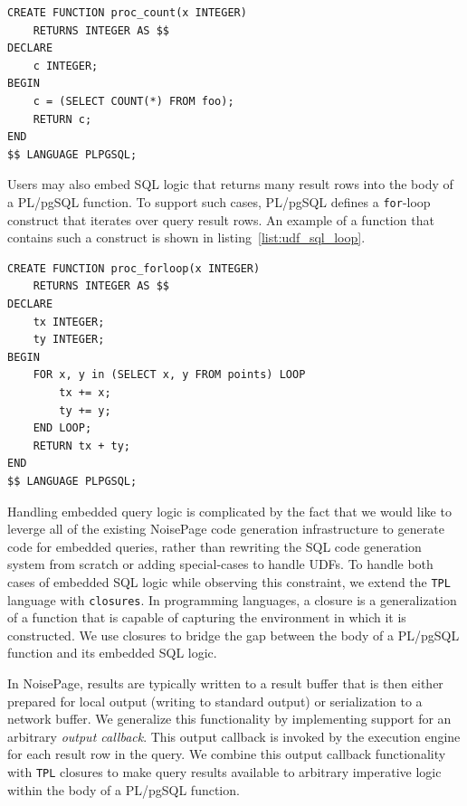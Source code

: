 \documentclass{vldb}
\newcommand{\tpl}{\texttt{TPL}\xspace}
\newcommand{\plpgsql}{PL/pgSQL\xspace}
\begin{document}
\begin{listing}
    \begin{verbatim}
CREATE FUNCTION proc_count(x INTEGER) 
    RETURNS INTEGER AS $$
DECLARE 
    c INTEGER;
BEGIN
    c = (SELECT COUNT(*) FROM foo);
    RETURN c;
END
$$ LANGUAGE PLPGSQL;
    \end{verbatim}
    \caption{A UDF with embedded SQL aggregation.}
    \label{list:udf_sql_simple}
\end{listing}

Users may also embed SQL logic that returns many result rows into the body of a \plpgsql function. To support such cases, \plpgsql defines a \texttt{for}-loop construct that iterates over query result rows. An example of a function that contains such a construct is shown in listing~\ref{list:udf_sql_loop}.

\begin{listing}
    \begin{verbatim}
CREATE FUNCTION proc_forloop(x INTEGER) 
    RETURNS INTEGER AS $$
DECLARE 
    tx INTEGER;
    ty INTEGER;
BEGIN
    FOR x, y in (SELECT x, y FROM points) LOOP
        tx += x;
        ty += y;
    END LOOP;
    RETURN tx + ty;
END
$$ LANGUAGE PLPGSQL;
    \end{verbatim}
    \caption{A UDF with For-S Style \texttt{for}-loop that iterates over query result.}
    \label{list:udf_sql_loop}
\end{listing}

Handling embedded query logic is complicated by the fact that we would like to leverge all of the existing NoisePage code generation infrastructure to generate code for embedded queries, rather than rewriting the SQL code generation system from scratch or adding special-cases to handle UDFs. To handle both cases of embedded SQL logic while observing this constraint, we extend the \tpl language with \texttt{closures}. In programming languages, a closure is a generalization of a function that is capable of capturing the environment in which it is constructed. We use closures to bridge the gap between the body of a \plpgsql function and its embedded SQL logic.

In NoisePage, results are typically written to a result buffer that is then either prepared for local output (writing to standard output) or serialization to a network buffer. We generalize this functionality by implementing support for an arbitrary \textit{output callback}. This output callback is invoked by the execution engine for each result row in the query. We combine this output callback functionality with \tpl closures to make query results available to arbitrary imperative logic within the body of a \plpgsql function. 
\end{document}
